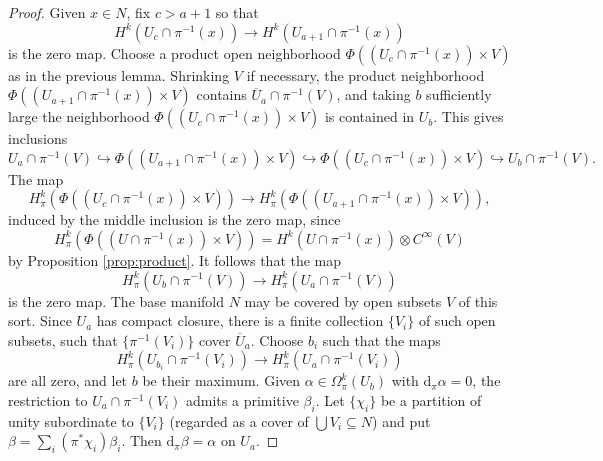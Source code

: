 \documentclass[11pt]{amsart}
\renewcommand\theenumi{\alph{enumi}}
\theoremstyle{definition}
\theoremstyle{remark}
\newcommand{\hra}{\hookrightarrow}
\renewcommand{\d}{{\mbox{d}}}
\newcommand{\ol}{\overline}
\renewcommand{\subset}{\subseteq}
\begin{document}
\begin{proof}\phantom{.}
	Given $x\in N$, fix  $c>a+1$ so that 	
	\[ H^k(U_{c}\cap \pi^{-1}(x))\to H^k(U_{a+1}\cap \pi^{-1}(x))\]
	is the zero map. 
	Choose a product open neighborhood $\Phi((U_c\cap \pi^{-1}(x))\times V)$ as in 
	the previous lemma. 
	Shrinking $V$ if necessary, the product neighborhood  $\Phi((U_{a+1}\cap \pi^{-1}(x))\times V)$ contains 
	$\ol{U}_{a}\cap \pi^{-1}(V)$, and taking $b$ sufficiently large the neighborhood $\Phi((U_c\cap \pi^{-1}(x))\times V)$ 
	is contained in $U_b$. This gives inclusions
	\[ U_{a}\cap \pi^{-1}(V)\hra  \Phi((U_{a+1}\cap \pi^{-1}(x))\times V)\hra \Phi((U_c\cap \pi^{-1}(x))\times V)
	\hra U_b\cap \pi^{-1}(V)
	.\]
  The map 
   \[ H^k_\pi (\Phi((U_c\cap \pi^{-1}(x))\times V))\to  H^k_\pi (\Phi((U_{a+1}\cap \pi^{-1}(x))\times V)),\]
 induced by the middle inclusion is the zero map, since 
 \[ H^k_\pi (\Phi((U\cap \pi^{-1}(x))\times V))=H^k(U\cap \pi^{-1}(x))\otimes C^\infty(V)\]
 by Proposition \ref{prop:product}. It follows that the map 
   \[ H^k_\pi(U_{b}\cap \pi^{-1}(V))\to H^k_\pi(U_a\cap \pi^{-1}(V))\]
 is the zero map.  The base manifold $N$ may be covered by open subsets $V$ of this sort. Since 
   $U_a$ has compact closure, there is a finite collection $\{V_i\}$ of such open subsets, such that 
   $\{\pi^{-1}(V_i)\}$ cover $\ol{U}_a$. Choose $b_i$ such that the maps 
     \[ H^k_\pi(U_{b_i}\cap \pi^{-1}(V_i))\to H^k_\pi(U_a\cap \pi^{-1}(V_i))\]
  are all zero, and let $b$ be their maximum. Given $\alpha\in \Omega^k_\pi(U_b)$ with $\d_\pi\alpha=0$, 
  the restriction to $U_{a}\cap \pi^{-1}(V_i)$ admits a primitive $\beta_i$. 
  Let  $\{\chi_i\}$ be a partition of unity  subordinate to $\{V_i\}$ (regarded as a cover of $\bigcup V_i\subset N$) 
    and put $\beta=\sum_i (\pi^*\chi_i)\beta_i$. 
  Then $\d_\pi\beta=\alpha$ on $U_a$. 
\end{proof}
\end{document}
